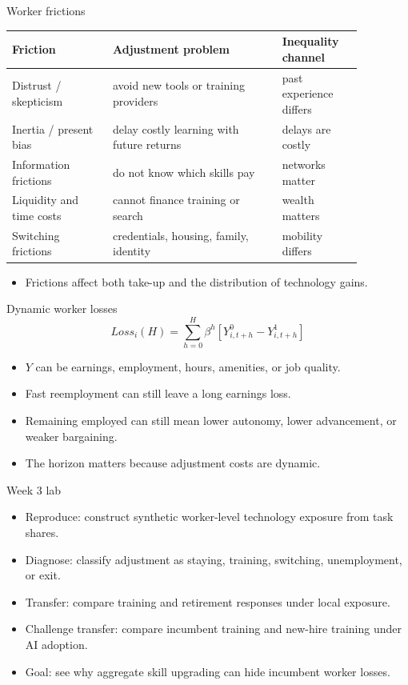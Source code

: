 \documentclass[aspectratio=169,11pt]{beamer}
\begin{document}
\begin{frame}{Worker frictions}
\small
\begin{tabular}{p{0.25\linewidth} p{0.42\linewidth} p{0.20\linewidth}}
\toprule
Friction & Adjustment problem & Inequality channel \\
\midrule
Distrust / skepticism & avoid new tools or training providers & past experience differs \\
Inertia / present bias & delay costly learning with future returns & delays are costly \\
Information frictions & do not know which skills pay & networks matter \\
Liquidity and time costs & cannot finance training or search & wealth matters \\
Switching frictions & credentials, housing, family, identity & mobility differs \\
\bottomrule
\end{tabular}
\vspace{0.3cm}
\begin{itemize}
    \item Frictions affect both take-up and the distribution of technology gains.
\end{itemize}
\end{frame}

\begin{frame}{Dynamic worker losses}
\[
Loss_i(H)
=
\sum_{h=0}^{H} \beta^h
\left[
Y_{i,t+h}^{0} - Y_{i,t+h}^{1}
\right]
\]
\begin{itemize}
    \item $Y$ can be earnings, employment, hours, amenities, or job quality.
    \item Fast reemployment can still leave a long earnings loss.
    \item Remaining employed can still mean lower autonomy, lower advancement, or weaker bargaining.
    \item The horizon matters because adjustment costs are dynamic.
\end{itemize}
\end{frame}

\begin{frame}{Week 3 lab}
\begin{itemize}
    \item Reproduce: construct synthetic worker-level technology exposure from task shares.
    \item Diagnose: classify adjustment as staying, training, switching, unemployment, or exit.
    \item Transfer: compare training and retirement responses under local exposure.
    \item Challenge transfer: compare incumbent training and new-hire training under AI adoption.
    \item Goal: see why aggregate skill upgrading can hide incumbent worker losses.
\end{itemize}
\end{frame}
\end{document}
